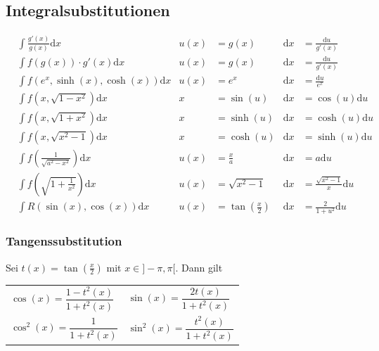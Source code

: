 \documentclass[a4paper, fontsize = 8pt, landscape]{scrartcl}
\begin{document}
\begin{multicols*}{3}
    \subsection{Integralsubstitutionen}
    \begin{small}
        \begin{align*}
             & \int \frac{g'(x)}{g(x)}\text{d}x                     & u(x) & =g(x)                         & \text{d}x & =\frac{\text{d}u}{g'(x)}          \\
             & \int f(g(x))\cdot g'(x)\text{d}x                     & u(x) & =g(x)                         & \text{d}x & =\frac{\text{d}u}{g'(x)}          \\
             & \int f(e^x, \sinh(x), \cosh(x))\text{d}x             & u(x) & =e^x                          & \text{d}x & =\frac{\text{d}u}{e^x}            \\
             & \int f(x, \sqrt{1-x^2})\text{d}x                     & x    & =\sin(u)                      & \text{d}x & =\cos(u)\text{d}u                 \\
             & \int f(x, \sqrt{1+x^2})\text{d}x                     & x    & =\sinh(u)                     & \text{d}x & =\cosh(u)\text{d}u                \\
             & \int f(x, \sqrt{x^2-1})\text{d}x                     & x    & =\cosh(u)                     & \text{d}x & =\sinh(u)\text{d}u                \\
             & \int f\left(\frac{1}{\sqrt{a^2-x^2}}\right)\text{d}x & u(x) & =\frac{x}{a}                  & \text{d}x & =a\text{d}u                       \\
             & \int f\left(\sqrt{1+\frac{1}{x^2}}\right)\text{d}x   & u(x) & =\sqrt{x^2-1}                 & \text{d}x & =\frac{\sqrt{x^2-1}}{x} \text{d}u \\
             & \int R(\sin(x), \cos(x))\text{d}x                    & u(x) & =\tan\left(\frac{x}{2}\right) & \text{d}x & =\frac{2}{1+u^2}\text{d}u
        \end{align*}
        \subsubsection*{Tangenssubstitution}

        Sei $t(x) = \tan(\frac{x}{2})$ mit $x \in ]-\pi, \pi[$. Dann gilt

        \begin{center}
            \renewcommand{\arraystretch}{1.5}
            \begin{tabular}{l l} \toprule
                $\cos(x) = \dfrac{1 - t^2(x)}{1 + t^2(x)}$ & $\sin(x) = \dfrac{2 t(x)}{1 + t^2(x)}$   \\
                $\cos^2(x) = \dfrac{1}{1 + t^2(x)}$        & $\sin^2(x) = \dfrac{t^2(x)}{1 + t^2(x)}$ \\
                \bottomrule
            \end{tabular}
        \end{center}
    \end{small}
\end{multicols*}

\setcounter{secnumdepth}{2}
\end{document}
